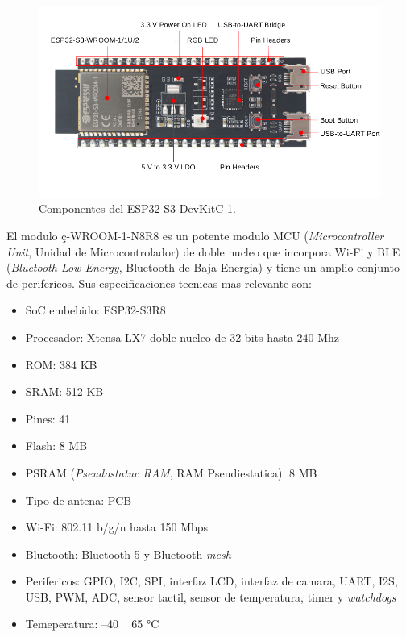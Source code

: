 \begin{figure}[h]
	\centering
	\includegraphics[scale=0.4]{./Figures/devkit_comp.png}
	\caption{Componentes del ESP32-S3-DevKitC-1.}
	\label{fig:devkit_comp}
\end{figure}

El modulo ç-WROOM-1-N8R8 es un potente modulo MCU (\textit{Microcontroller Unit}, Unidad de Microcontrolador) de doble nucleo que incorpora Wi-Fi y BLE (\textit{Bluetooth Low Energy}, Bluetooth de Baja Energia) y tiene un amplio conjunto de perifericos. Sus especificaciones tecnicas mas relevante son:
\begin{itemize}
	\item SoC embebido: ESP32-S3R8
	\item Procesador: Xtensa LX7 doble nucleo de 32 bits hasta 240 Mhz
	\item ROM: 384 KB
	\item SRAM: 512 KB
	\item Pines: 41
	\item Flash: 8 MB
	\item PSRAM (\textit{Pseudostatuc RAM}, RAM Pseudiestatica): 8 MB
	\item Tipo de antena: PCB
	\item Wi-Fi: 802.11 b/g/n hasta 150 Mbps
	\item Bluetooth: Bluetooth 5 y Bluetooth \textit{mesh}
	\item Perifericos: GPIO, I2C, SPI, interfaz LCD, interfaz de camara, UART, I2S, USB, PWM, ADC, sensor tactil, sensor de temperatura, timer y \textit{watchdogs}
	\item Temeperatura:  –40 ~ 65 °C
\end{itemize}

